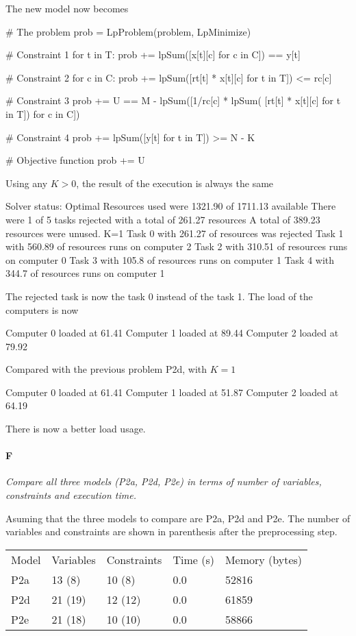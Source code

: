 \documentclass[11pt,a4paper]{article}
\begin{document}
The new model now becomes
%
\begin{pycode}
# The problem
prob = LpProblem(problem, LpMinimize)

# Constraint 1
for t in T:
	prob += lpSum([x[t][c] for c in C]) == y[t]

# Constraint 2
for c in C:
	prob += lpSum([rt[t] * x[t][c] for t in T]) <= rc[c]

# Constraint 3
prob += U == M - lpSum([1/rc[c] * lpSum(
	[rt[t] * x[t][c] for t in T]) for c in C])

# Constraint 4
prob += lpSum([y[t] for t in T]) >= N - K

# Objective function
prob += U
\end{pycode}
%
Using any $K>0$, the result of the execution is always the same
%
\begin{textcode}
Solver status: Optimal
Resources used were 1321.90 of 1711.13 available
There were 1 of 5 tasks rejected with a total of 261.27 resources
A total of 389.23 resources were unused. K=1
Task 0 with 261.27 of resources was rejected
Task 1 with 560.89 of resources runs on computer 2
Task 2 with 310.51 of resources runs on computer 0
Task 3 with 105.8 of resources runs on computer 1
Task 4 with 344.7 of resources runs on computer 1
\end{textcode}
%
The rejected task is now the task 0 instead of the task 1. The load of the 
computers is now
\begin{textcode}
Computer 0 loaded at 61.41%
Computer 1 loaded at 89.44%
Computer 2 loaded at 79.92%
\end{textcode}
Compared with the previous problem P2d, with $K=1$
\begin{textcode}
Computer 0 loaded at 61.41%
Computer 1 loaded at 51.87%
Computer 2 loaded at 64.19%
\end{textcode}
There is now a better load usage.

\paragraph*{F}
{\sl Compare all three models (P2a, P2d, P2e) in terms of number of variables, 
constraints and execution time.}

Asuming that the three models to compare are P2a, P2d and P2e. The number of 
variables and constraints are shown in parenthesis after the preprocessing step.

\begin{tabular}{l l l l l}
Model & Variables & Constraints & Time (s) & Memory (bytes)\\
P2a & 13 (8) & 10 (8) & 0.0 & 52816\\
P2d & 21 (19) & 12 (12) & 0.0 & 61859\\
P2e & 21 (18) & 10 (10) & 0.0 & 58866\\
\end{tabular}
\end{document}
